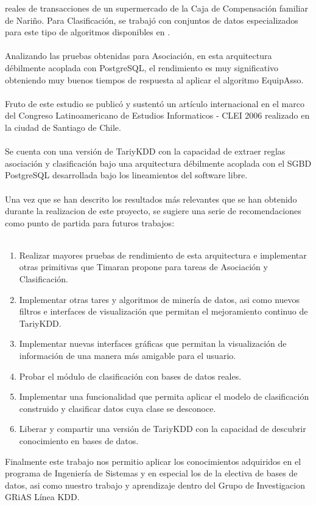 reales de transacciones de un supermercado de la Caja de Compensaci\'on familiar
de Nari\~no. Para Clasificaci\'on, se trabaj\'o 
con conjuntos de datos especializados para este
tipo de algoritmos disponibles en \cite{data}.\\
\\
Analizando las pruebas obtenidas para Asociaci\'on, en esta arquitectura d\'ebilmente acoplada con PostgreSQL, el rendimiento es muy significativo obteniendo muy buenos tiempos de respuesta al aplicar el algoritmo EquipAsso. \\
\\
Fruto de este estudio se public\'o y sustent\'o un art\'iculo internacional en el marco del Congreso Latinoamericano de Estudios Informaticos - CLEI 2006 realizado en la ciudad de Santiago de Chile.\\
\\
Se cuenta con una versi\'on de TariyKDD con la capacidad de extraer reglas asociaci\'on y clasificaci\'on bajo una arquitectura d\'ebilmente acoplada con el SGBD PostgreSQL desarrollada bajo los lineamientos del software libre.\\
\\
Una vez que se han descrito los resultados m\'as relevantes que se han obtenido durante la realizacion de este proyecto, se sugiere una serie de recomendaciones como punto de partida para futuros trabajos:\\
\\
\begin{enumerate}
\item Realizar mayores pruebas de rendimiento de esta arquitectura e implementar otras primitivas que Timaran propone para tareas de Asociaci\'on y Clasificaci\'on.
\item Implementar otras tares y algoritmos de miner\'ia de datos, asi como nuevos filtros e interfaces de visualizaci\'on que permitan el mejoramiento continuo de TariyKDD.
\item Implementar nuevas interfaces gr\'aficas que permitan la visualizaci\'on de informaci\'on de una manera m\'as amigable para el usuario.
\item Probar el m\'odulo de clasificaci\'on con bases de datos reales.
\item Implementar una funcionalidad que permita aplicar el modelo de clasificaci\'on construido y clasificar datos cuya clase se desconoce.
\item Liberar y compartir una versi\'on de TariyKDD con la capacidad de descubrir conocimiento en bases de datos.
\end{enumerate}

Finalmente este trabajo nos permitio aplicar los conocimientos adquiridos en el programa de Ingenier\'ia de Sistemas y en especial los de la electiva de bases de datos, asi como nuestro trabajo y aprendizaje dentro del Grupo de Investigacion GRiAS L\'inea KDD.\\

